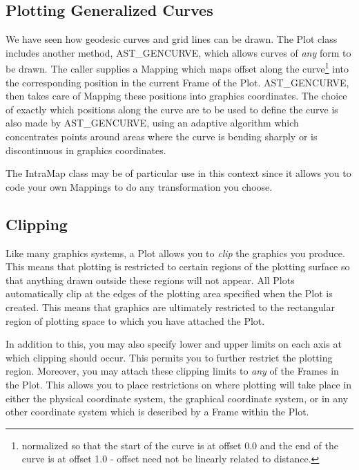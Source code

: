 \documentclass[twoside,11pt]{article}
\newcommand{\htmlref}[2]{#1}
\begin{document}
\subsection{\label{ss:plottinggeneralizedcurves}Plotting Generalized Curves}
We have seen how geodesic curves and grid lines can be drawn. The \htmlref{Plot}{Plot}
class includes another method,
AST_GENCURVE,
which allows curves of {\em any} form to be drawn. The caller supplies a
\htmlref{Mapping}{Mapping} which maps offset along the curve\footnote{normalized so that the
start of the curve is at offset 0.0 and the end of the curve is at offset
1.0 - offset need not be linearly related to distance.} into the
corresponding position in the current \htmlref{Frame}{Frame} of the Plot.
AST_GENCURVE,
then takes care of Mapping these positions into graphics coordinates. The
choice of exactly which positions along the curve are to be used to
define the curve is also made by
AST_GENCURVE,
using an adaptive algorithm which concentrates points around areas where
the curve is bending sharply or is discontinuous in graphics coordinates.

The \htmlref{IntraMap}{IntraMap} class may be of particular use in this context since it allows 
you to code your own Mappings to do any transformation you choose.


\subsection{\label{ss:clipping}Clipping}

Like many graphics systems, a \htmlref{Plot}{Plot} allows you to {\em{clip}} the graphics
you produce. This means that plotting is restricted to certain regions
of the plotting surface so that anything drawn outside these regions
will not appear.  All Plots automatically clip at the edges of the
plotting area specified when the Plot is created. This means that
graphics are ultimately restricted to the rectangular region of
plotting space to which you have attached the Plot.

In addition to this, you may also specify lower and upper limits on
each axis at which clipping should occur. This permits you to further
restrict the plotting region. Moreover, you may attach these clipping
limits to {\em{any}} of the Frames in the Plot. This allows you to
place restrictions on where plotting will take place in either the
physical coordinate system, the graphical coordinate system, or in any
other coordinate system which is described by a \htmlref{Frame}{Frame} within the Plot.
\end{document}
